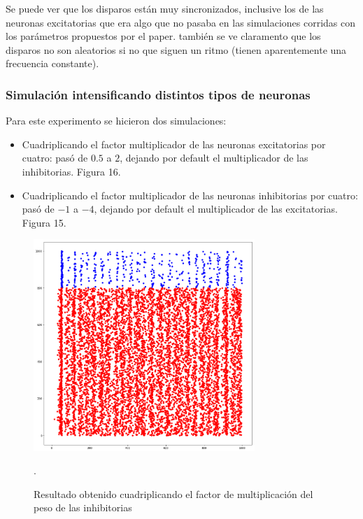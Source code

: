 \documentclass[12pt]{article}
\begin{document}
\newpage

Se puede ver que los disparos están muy sincronizados, inclusive los de las neuronas excitatorias que era algo que no pasaba en las simulaciones corridas con los parámetros propuestos por el paper.
también se ve claramento que los disparos no son aleatorios si no que siguen un ritmo (tienen aparentemente una frecuencia constante).

\subsubsection{Simulación intensificando distintos tipos de neuronas}
Para este experimento se hicieron dos simulaciones:
\begin{itemize}
    \item Cuadriplicando el factor multiplicador de las neuronas excitatorias por cuatro: pasó de $0.5$ a $2$, dejando por default el multiplicador de las inhibitorias. Figura 16.
    \item Cuadriplicando el factor multiplicador de las neuronas inhibitorias por cuatro: pasó de $-1$ a $-4$, dejando por default el multiplicador de las excitatorias. Figura 15.
\end{itemize}

\begin{figure}[htp!]
    \centering
        \includegraphics[height=8cm]{images/resultadoCuadrupleInhibitoria.png}
    \caption[fontsize=2pt]{Resultado obtenido cuadriplicando el factor de multiplicación del peso de las inhibitorias}.
\end{figure}
\end{document}
